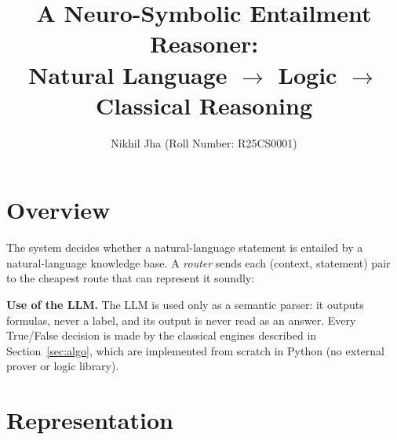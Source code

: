 \documentclass[10pt,a4paper]{article}
\title{\vspace{-1.2cm}A Neuro-Symbolic Entailment Reasoner:\\ Natural Language $\rightarrow$ Logic $\rightarrow$ Classical Reasoning}
\author{Nikhil Jha \quad (Roll Number: R25CS0001)}
\date{}
\begin{document}
\maketitle
\vspace{-1cm}

\section{Overview}
The system decides whether a natural-language statement is entailed by a natural-language knowledge base. A \emph{router} sends each (context, statement) pair to the cheapest route that can represent it soundly:

\begin{center}
\small
{}
\end{center}

\noindent\textbf{Use of the LLM.} The LLM is used only as a semantic parser: it outputs formulas, never a label, and its output is never read as an answer. Every True/False decision is made by the classical engines described in Section~\ref{sec:algo}, which are implemented from scratch in Python (no external prover or logic library).

\section{Representation}
\label{sec:repr}
\end{document}
